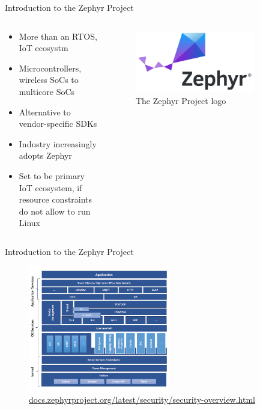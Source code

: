 \documentclass[10pt, aspectratio=169]{beamer}
\begin{document}
\begin{frame}[fragile]{Introduction to the Zephyr Project}
  \begin{columns}
    \begin{column}{0.6\textwidth}
      \begin{itemize}
        \item More than an RTOS, IoT ecosystm
        \item Microcontrollers, wireless SoCs to multicore SoCs
        \item Alternative to vendor-specific SDKs
        \item Industry increasingly adopts Zephyr
        \item Set to be primary IoT ecosystem, if resource constraints do not allow to run Linux
      \end{itemize}
    \end{column}
    \begin{column}{0.4\textwidth}
      \begin{figure}
        \includegraphics[width=0.8\textwidth]{images/zephyr_logo.png}
        \caption*{The Zephyr Project logo}
      \end{figure}
    \end{column}
  \end{columns}
\end{frame}
\begin{frame}[fragile]{Introduction to the Zephyr Project}
  \begin{figure}
    \includegraphics[width=0.55\textwidth]{images/system-architecture.png}
    \caption*{\href{https://docs.zephyrproject.org/latest/security/security-overview.html}{docs.zephyrproject.org/latest/security/security-overview.html}}
  \end{figure}
\end{frame}
\end{document}
